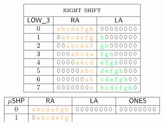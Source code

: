 \begin{figure}[!h]
\[\begin{array}{|c|r|l|}
        \hline
        \multicolumn{3}{|c|}{\phantom{\Big(}\textsc{right shift}\phantom{\Big(}} \\
        \hline
        \LT{} & \multicolumn{1}{c|}{\ra} & \multicolumn{1}{c|}{\la} \\ \hline
        0
        &\yellowm{\texttt{a\,b\,c\,d\,e\,f\,g\,h}}
        &\color{draculagreen}\texttt{\lightGray{0\,0\,0\,0\,0\,0\,0\,0}}
        \\ \hline
        1
        &\yellowm{\texttt{\lightGray{0\,}a\,b\,c\,d\,e\,f\,g}}
        &\color{draculagreen}\texttt{h\,\lightGray{0\,0\,0\,0\,0\,0\,0}}
        \\ \hline
        2
        &\yellowm{\texttt{\lightGray{0\,0\,}a\,b\,c\,d\,e\,f}}
        &\color{draculagreen}\texttt{g\,h\,\lightGray{0\,0\,0\,0\,0\,0}}
        \\ \hline
        3
        &\yellowm{\texttt{\lightGray{0\,0\,0\,}a\,b\,c\,d\,e}}
        &\color{draculagreen}\texttt{f\,g\,h\,\lightGray{0\,0\,0\,0\,0}}
        \\ \hline
        4
        &\yellowm{\texttt{\lightGray{0\,0\,0\,0\,}a\,b\,c\,d}}
        &\color{draculagreen}\texttt{e\,f\,g\,h\,\lightGray{0\,0\,0\,0}}
        \\ \hline
        5
        &\yellowm{\texttt{\lightGray{0\,0\,0\,0\,0\,}a\,b\,c}}
        &\color{draculagreen}\texttt{d\,e\,f\,g\,h\,\lightGray{0\,0\,0}}
        \\ \hline
        6
        &\yellowm{\texttt{\lightGray{0\,0\,0\,0\,0\,0\,}a\,b}}
        &\color{draculagreen}\texttt{c\,d\,e\,f\,g\,h\,\lightGray{0\,0}}
        \\ \hline
        7
        &\yellowm{\texttt{\lightGray{0\,0\,0\,0\,0\,0\,0\,}a}}
        &\color{draculagreen}\texttt{b\,c\,d\,e\,f\,g\,h\,\lightGray{0}}
        \\ \hline
    \end{array}
\]
\centering
\[
    \begin{array}{|c|c|c|c|}
        \hline
        \mshp{} & \multicolumn{1}{c|}{\ra} & \multicolumn{1}{c|}{\la} & \ONES{} \\ %
        \hline
        0
        &\yellowm{ \texttt{a\,b\,c\,d\,e\,f\,g\,h}}
        &\color{draculagreen} \texttt{\lightGray{0\,0\,0\,0\,0\,0\,0\,0}}
        & \texttt{\lightGray{0\,0\,0\,0\,0\,0\,0\,0}} \\
        \hline
        1
        &\yellowm{ \texttt{\lightGray{0}\,a\,b\,c\,d\,e\,f\,g}}

\end{array}\]
\end{figure}
